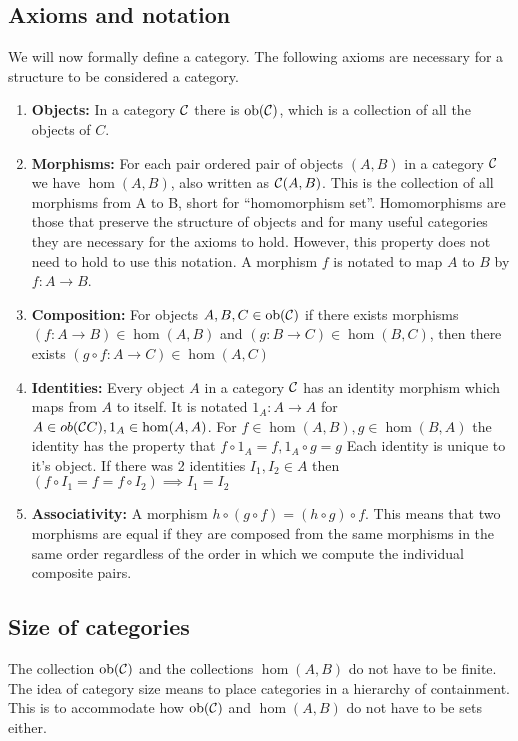 \documentclass[10pt,a4paper,reqno]{amsart}
\numberwithin{figure}{section}
\begin{document}
\subsection{Axioms and notation}
We will now formally define a category. The following axioms are necessary for a
structure to be considered a category.
\begin{enumerate}
        \item \textbf{Objects:} In a category $\mathcal{C}$ there is
        $\operatorname{ob}(\mathcal{C})$, which is a collection of all the objects of $C$.

        \item \textbf{Morphisms:} For each pair ordered pair of objects $(A,B)$
        in a category $\mathcal{C}$ we have $\hom(A,B)$, also written as
        $\mathcal{C}(A,B)$.  This is the collection of all morphisms from A to B,
        short for ``homomorphism set''.  Homomorphisms are those that preserve
        the structure of objects and for many useful categories they are
        necessary for the axioms to hold.  However, this property does not need
        to hold to use this notation.  A morphism $f$ is notated to map $A$ to
        $B$ by $f: A\to B$.

        \item \textbf{Composition:} For objects $A,B,C\in \operatorname{ob}(\mathcal{C})$
        if there exists morphisms $(f: A\to B)\in \hom(A,B)$ and $(g: B\to C)\in
        \hom(B,C)$, then there exists $(g\circ f: A\to C)\in \hom(A,C)$

        \item \textbf{Identities:} Every object $A$ in a category $\mathcal{C}$
        has an identity morphism which maps from $A$ to itself.  It is notated
        $1_A: A\to A$ for $A\in ob(\mathcal{C}C), 1_A\in \hom(A,A)$.  For $f\in
        \hom(A,B), g\in \hom(B,A)$ the identity has the property that $f\circ
        1_A = f, 1_A\circ g = g$ Each identity is unique to it's object. If
        there was 2 identities $I_1,I_2\in A$ then $(f\circ I_1 = f = f\circ
        I_2) \implies I_1=I_2$

        \item \textbf{Associativity:} A morphism $h\circ(g\circ f) = (h\circ
        g)\circ f$.  This means that two morphisms are equal if they are
        composed from the same morphisms in the same order regardless of the
        order in which we compute the individual composite pairs.
\end{enumerate}

\subsection{Size of categories}
The collection $\operatorname{ob}(\mathcal{C})$ and the collections $\hom(A,B)$ do not have
to be finite.  The idea of category size means to place categories in a
hierarchy of containment. This is to accommodate how $\operatorname{ob}(\mathcal{C})$ and
$\hom(A,B)$ do not have to be sets either.
\end{document}
